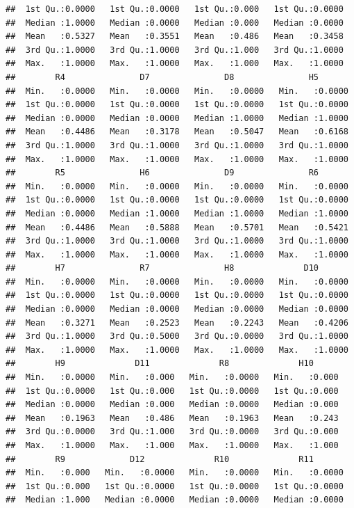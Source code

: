 \documentclass[
]{book}
\begin{document}
\begin{verbatim}
##  1st Qu.:0.0000   1st Qu.:0.0000   1st Qu.:0.000   1st Qu.:0.0000  
##  Median :1.0000   Median :0.0000   Median :0.000   Median :0.0000  
##  Mean   :0.5327   Mean   :0.3551   Mean   :0.486   Mean   :0.3458  
##  3rd Qu.:1.0000   3rd Qu.:1.0000   3rd Qu.:1.000   3rd Qu.:1.0000  
##  Max.   :1.0000   Max.   :1.0000   Max.   :1.000   Max.   :1.0000  
##        R4               D7               D8               H5        
##  Min.   :0.0000   Min.   :0.0000   Min.   :0.0000   Min.   :0.0000  
##  1st Qu.:0.0000   1st Qu.:0.0000   1st Qu.:0.0000   1st Qu.:0.0000  
##  Median :0.0000   Median :0.0000   Median :1.0000   Median :1.0000  
##  Mean   :0.4486   Mean   :0.3178   Mean   :0.5047   Mean   :0.6168  
##  3rd Qu.:1.0000   3rd Qu.:1.0000   3rd Qu.:1.0000   3rd Qu.:1.0000  
##  Max.   :1.0000   Max.   :1.0000   Max.   :1.0000   Max.   :1.0000  
##        R5               H6               D9               R6        
##  Min.   :0.0000   Min.   :0.0000   Min.   :0.0000   Min.   :0.0000  
##  1st Qu.:0.0000   1st Qu.:0.0000   1st Qu.:0.0000   1st Qu.:0.0000  
##  Median :0.0000   Median :1.0000   Median :1.0000   Median :1.0000  
##  Mean   :0.4486   Mean   :0.5888   Mean   :0.5701   Mean   :0.5421  
##  3rd Qu.:1.0000   3rd Qu.:1.0000   3rd Qu.:1.0000   3rd Qu.:1.0000  
##  Max.   :1.0000   Max.   :1.0000   Max.   :1.0000   Max.   :1.0000  
##        H7               R7               H8              D10        
##  Min.   :0.0000   Min.   :0.0000   Min.   :0.0000   Min.   :0.0000  
##  1st Qu.:0.0000   1st Qu.:0.0000   1st Qu.:0.0000   1st Qu.:0.0000  
##  Median :0.0000   Median :0.0000   Median :0.0000   Median :0.0000  
##  Mean   :0.3271   Mean   :0.2523   Mean   :0.2243   Mean   :0.4206  
##  3rd Qu.:1.0000   3rd Qu.:0.5000   3rd Qu.:0.0000   3rd Qu.:1.0000  
##  Max.   :1.0000   Max.   :1.0000   Max.   :1.0000   Max.   :1.0000  
##        H9              D11              R8              H10       
##  Min.   :0.0000   Min.   :0.000   Min.   :0.0000   Min.   :0.000  
##  1st Qu.:0.0000   1st Qu.:0.000   1st Qu.:0.0000   1st Qu.:0.000  
##  Median :0.0000   Median :0.000   Median :0.0000   Median :0.000  
##  Mean   :0.1963   Mean   :0.486   Mean   :0.1963   Mean   :0.243  
##  3rd Qu.:0.0000   3rd Qu.:1.000   3rd Qu.:0.0000   3rd Qu.:0.000  
##  Max.   :1.0000   Max.   :1.000   Max.   :1.0000   Max.   :1.000  
##        R9             D12              R10              R11        
##  Min.   :0.000   Min.   :0.0000   Min.   :0.0000   Min.   :0.0000  
##  1st Qu.:0.000   1st Qu.:0.0000   1st Qu.:0.0000   1st Qu.:0.0000  
##  Median :1.000   Median :0.0000   Median :0.0000   Median :0.0000  

\end{verbatim}
\end{document}
